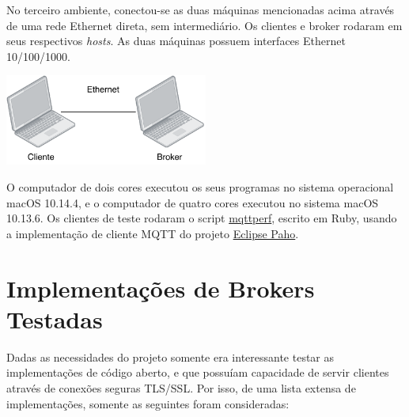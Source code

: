 \documentclass[12pt,a4paper]{article}
\begin{document}
No terceiro ambiente, conectou-se as duas máquinas mencionadas acima através de uma rede Ethernet direta, sem intermediário. Os clientes e broker rodaram em seus respectivos \textit{hosts}. As duas máquinas possuem interfaces Ethernet 10/100/1000.
\begin{center}
\includegraphics[width=0.5\textwidth]{ethernet}
\end{center}

O computador de dois cores executou os seus programas no sistema operacional macOS 10.14.4, e o computador de quatro cores executou no sistema macOS 10.13.6. Os clientes de teste rodaram o script \href{https://github.com/batmacumba/mqttperf}{mqttperf}, escrito em Ruby, usando a implementação de cliente MQTT do projeto  \href{https://github.com/eclipse/paho.mqtt.ruby}{Eclipse Paho}.


\section{Implementações de Brokers Testadas}
Dadas as necessidades do projeto somente era interessante testar as implementações de código aberto, e que possuíam capacidade de servir clientes através de conexões seguras TLS/SSL. Por isso, de uma lista extensa de implementações, somente as seguintes foram consideradas:
\end{document}
